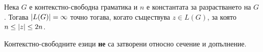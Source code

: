 \begin{crl}
  Нека $G$ е контекстно-свободна граматика и $n$ е константата за разрастването на $G$.
  Тогава $\vert{L(G)}\vert = \infty$ точно тогава, когато съществува $z \in L(G)$, за която $n \leq \vert{z}\vert \leq 2n$.
\end{crl}

\begin{thm}
  Контекстно-свободните езици {\bf не} са затворени относно сечение и допълнение.
\end{thm}



